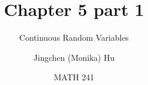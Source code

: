 \documentclass[slidestop,compress,mathserif]{beamer}
\title[Chapter 5 part 1]{Chapter 5 part 1}
\subtitle{Continuous Random Variables}
\author[Jingchen (Monika) Hu] %
{Jingchen (Monika) Hu}
\institute[Vassar] %
{Vassar College}
\date[MATH 241] %
{MATH 241}
\begin{document}


\begin{frame}%
\titlepage
\end{frame}


\end{document}
